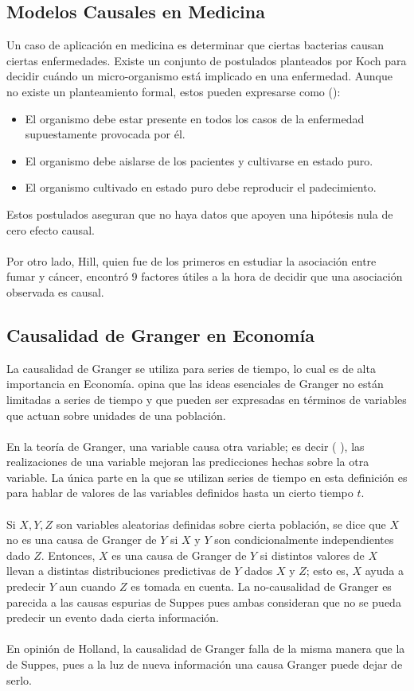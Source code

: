 \documentclass[11pt]{article}
\theoremstyle{plain}
\begin{document}
\subsection{Modelos Causales en Medicina}
Un caso de aplicación en medicina es determinar que ciertas bacterias causan ciertas enfermedades. Existe un conjunto de postulados planteados por Koch para decidir cuándo un micro-organismo está implicado en una enfermedad. Aunque no existe un planteamiento formal, estos pueden expresarse como (\cite{yerushalmy1959methodology}):
\begin{itemize}
\item El organismo debe estar presente en todos los casos de la enfermedad supuestamente provocada por él.
\item El organismo debe aislarse de los pacientes y cultivarse en estado puro.
\item El organismo cultivado en estado puro debe reproducir el padecimiento. 
\end{itemize}
Estos postulados aseguran que no haya datos que apoyen una hipótesis nula de cero efecto causal. \\
\\
Por otro lado, Hill, quien fue de los primeros en estudiar la asociación entre fumar y cáncer, encontró 9 factores útiles a la hora de decidir que una asociación observada es causal. 
\subsection{Causalidad de Granger en Economía}
La causalidad de Granger se utiliza para series de tiempo, lo cual es de alta importancia en Economía. \cite{holland1986statistics} opina que las ideas esenciales de Granger no están limitadas a series de tiempo y que pueden ser expresadas en términos de variables que actuan sobre unidades de una población.\\
\\
En la teoría de Granger, una variable causa otra variable; es decir ( \cite{holland1986statistics}), las realizaciones de una variable mejoran las predicciones hechas sobre la otra variable. La única parte en la que se utilizan series de tiempo en esta definición es para hablar de valores de las variables definidos hasta un cierto tiempo $t$.\\
\\
Si $X,Y,Z$ son variables aleatorias definidas sobre cierta población, se dice que $X$ no es una causa de Granger de $Y$ si $X$ y $Y$ son condicionalmente independientes dado $Z$. Entonces, $X$ es una causa de Granger de $Y$ si distintos valores de $X$ llevan a distintas distribuciones predictivas de $Y$ dados $X$ y $Z$; esto es, $X$ ayuda a predecir $Y$ aun cuando $Z$ es tomada en cuenta. La no-causalidad de Granger es parecida a las causas espurias de Suppes pues ambas consideran que no se pueda predecir un evento dada cierta información.\\
\\
En opinión de Holland, la causalidad de Granger falla de la misma manera que la de Suppes, pues a la luz de nueva información una causa Granger puede dejar de serlo.
\end{document}
